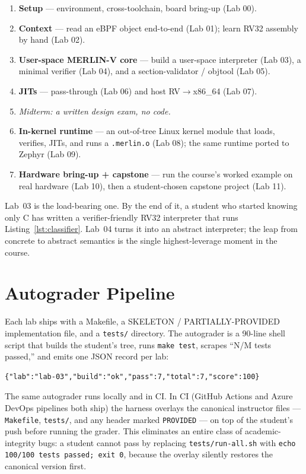 \documentclass[11pt,a4paper]{article}
\begin{document}
\begin{enumerate}[leftmargin=*]
  \item \textbf{Setup} --- environment, cross-toolchain, board
    bring-up (Lab 00).
  \item \textbf{Context} --- read an eBPF object end-to-end
    (Lab 01); learn RV32 assembly by hand (Lab 02).
  \item \textbf{User-space MERLIN-V core} --- build a user-space
    interpreter (Lab 03), a minimal verifier (Lab 04), and a
    section-validator / objtool (Lab 05).
  \item \textbf{JITs} --- pass-through (Lab 06) and host
    RV$\rightarrow$x86\_64 (Lab 07).
  \item \emph{Midterm: a written design exam, no code.}
  \item \textbf{In-kernel runtime} --- an out-of-tree Linux
    kernel module that loads, verifies, JITs, and runs a
    \texttt{.merlin.o} (Lab 08); the same runtime ported to
    Zephyr (Lab 09).
  \item \textbf{Hardware bring-up + capstone} --- run the
    course's worked example on real hardware (Lab 10), then
    a student-chosen capstone project (Lab 11).
\end{enumerate}

Lab~03 is the load-bearing one.  By the end of it, a student
who started knowing only C has written a verifier-friendly RV32
interpreter that runs Listing~\ref{lst:classifier}.  Lab~04
turns it into an abstract interpreter; the leap from concrete
to abstract semantics is the single highest-leverage moment in
the course.

\section{Autograder Pipeline}
\label{sec:autograder}

Each lab ships with a Makefile, a SKELETON / PARTIALLY-PROVIDED
implementation file, and a \texttt{tests/} directory.  The
autograder is a 90-line shell script that builds the student's
tree, runs \texttt{make test}, scrapes ``N/M tests passed,''
and emits one JSON record per lab:

\begin{lstlisting}[caption={Autograder JSON record.}]
{"lab":"lab-03","build":"ok","pass":7,"total":7,"score":100}
\end{lstlisting}

The same autograder runs locally and in CI.  In CI (GitHub
Actions and Azure DevOps pipelines both ship) the harness
overlays the canonical instructor files --- \texttt{Makefile},
\texttt{tests/}, and any header marked \texttt{PROVIDED} ---
on top of the student's push before running the grader.  This
eliminates an entire class of academic-integrity bugs: a
student cannot pass by replacing \texttt{tests/run-all.sh} with
\texttt{echo 100/100 tests passed; exit 0}, because the overlay
silently restores the canonical version first.
\end{document}
